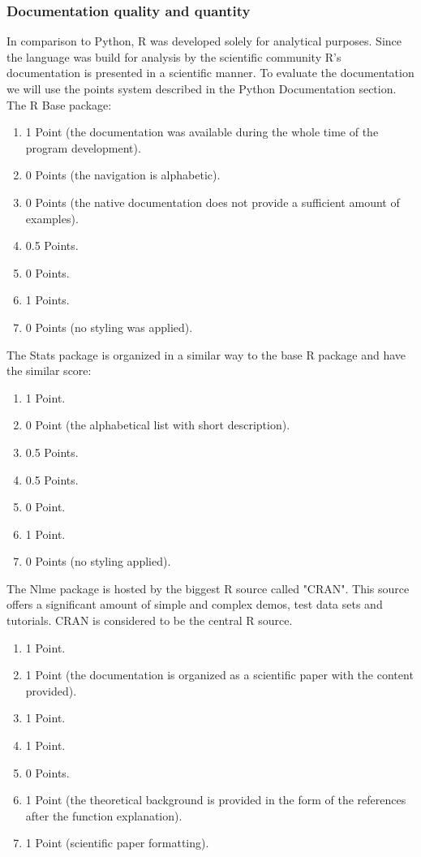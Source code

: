 \documentclass [twoside,
  11pt, a4paper,
  footinclude=true,
  headinclude=true,
  cleardoublepage=empty
]{article}
\begin{document}
\subsubsection{Documentation quality and quantity}
In comparison to Python, R was developed solely for analytical purposes. Since the language was build for analysis by the scientific community R's documentation is presented in a scientific manner. To evaluate the documentation we will use the points system described in the Python Documentation section.\\
The R Base package:
\begin{enumerate}
    \item 1 Point (the documentation was available during the whole time of the program development).
    \item 0 Points (the navigation is alphabetic).
    \item 0 Points (the native documentation does not provide a sufficient amount of examples).
    \item 0.5 Points.
    \item 0 Points.
    \item 1 Points.
    \item 0 Points (no styling was applied).
\end{enumerate}
The Stats package is organized in a similar way to the base R package and have the similar score:
\begin{enumerate}
    \item 1 Point.
    \item 0 Point (the alphabetical list with short description).
    \item 0.5 Points.
    \item 0.5 Points.
    \item 0 Point.
    \item 1 Point.
    \item 0 Points (no styling applied).
\end{enumerate} 
The Nlme package is hosted by the biggest R source called "CRAN". This source offers a significant amount of simple and complex demos, test data sets and tutorials. CRAN is considered to be the central R source.
\begin{enumerate}
    \item 1 Point.
    \item 1 Point (the documentation is organized as a scientific paper with the content provided).
    \item 1 Point.
    \item 1 Point.
    \item 0 Points.
    \item 1 Point (the theoretical background is provided in the form of the references after the function explanation).
    \item 1 Point (scientific paper formatting).
\end{enumerate}
\end{document}
